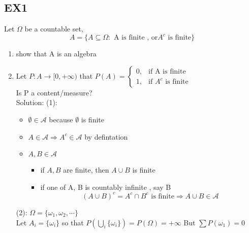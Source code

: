  \subsection*{EX1}
 Let $ \Omega  $ be a countable set,$$
    A=\{A\subseteq \Omega:\text{ A is finite , or} A^c \text{ is finite}\}
 $$  
  \begin{enumerate}[label=\circled{\arabic*}] 
  \item show that A is an algebra
  \item Let $ P:A\rightarrow[0,+\infty) $ that $P(A)=\begin{cases}
    0, & \text{if A is finite} \\
    1, & \text{if }A^c\text{ is finite}
  \end{cases} $
  \\Is P a content/measure?
  \\Solution:
  (1):\begin{itemize}
  \item $\emptyset \in \mathcal{A}$ because $\emptyset$ is finite 
  \item $ A\in \mathcal{A} \Rightarrow A^c\in \mathcal{A} $ by defintation
  \item $ A,B\in \mathcal{A} $
  \begin{itemize}
  \item if $ A,B $ are finite, then $ A\cup B $ is finite
  \item if one of A, B is countably infinite , say B $$
    (A\cup B)^c=A^c\cap B^c \text{ is finite} \Rightarrow A\cup B\in \mathcal{A}
  $$ 
  \end{itemize} 
  \end{itemize}
  (2): $ \Omega=\{\omega_1,\omega_2,\cdots\} $ \\
  Let $ A_i=\{\omega_i\} $ so that $ P(\bigcup_i\{\omega_i\})=P(\Omega)=+\infty $ But $ \sum P(\omega_1)=0 $ 
  \end{enumerate}
